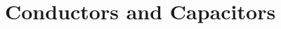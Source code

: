 \documentclass[../em.tex]{subfiles}
\begin{document}
\chapter{Conductors and Capacitors}
\end{document}
